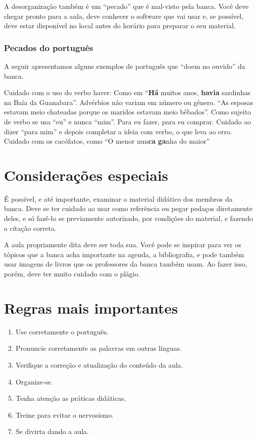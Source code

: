 \documentclass{article}
\begin{document}
A desorganização também é um ``pecado'' que é mal-visto pela banca. Você deve chegar pronto para a aula, deve conhecer o software que vai usar e, se possível, deve estar disponível no local antes do horário para preparar o seu material.





\subsubsection{Pecados do português}

A seguir apresentamos alguns exemplos de português que ``doem no ouvido'' da banca.
\begin{outline}
\1 Cuidado com o uso do verbo haver:
\2 Como em ``\textbf{Há} muitos anos, \textbf{havia} sardinhas na Baía da Guanabara''.
\1 Advérbios não variam em número ou gênero.
\2 ``As esposas estavam meio chateadas porque os maridos estavam meio bêbados''.
\1 Como sujeito de verbo se usa ``eu'' e nunca ``mim''. Para eu fazer, para eu comprar. Cuidado ao dizer ``para mim'' e depois  completar a ideia com verbo, o que leva ao erro.
\1 Cuidado com os cacófatos, como ``O menor nun\textbf{ca} \textbf{ga}nha do maior''
\end{outline}

\section{Considerações especiais}

É possível, e até importante,  examinar o material didático dos membros da banca. Deve se ter cuidado ao usar como referência ou pegar pedaços diretamente deles, e só fazê-lo se previamente autorizado, por condições do material, e fazendo a citação correta. 

A aula propriamente dita deve ser toda sua. Você pode se inspirar para ver os tópicos que a banca acha importante na agenda, a bibliografia, e pode também usar imagens de livros que os professores da banca também usam. Ao fazer isso, porém, deve ter muito cuidado com o plágio.

\section{Regras mais importantes}

\begin{enumerate}
\item Use corretamente o português.
\item Pronuncie corretamente as palavras em outras línguas.
\item Verifique a correção e atualização do conteúdo da aula.
\item Organize-se.
\item Tenha atenção as práticas didáticas.
\item Treine para evitar o nervosismo.
\item Se divirta dando a aula.
\end{enumerate}
\end{document}
